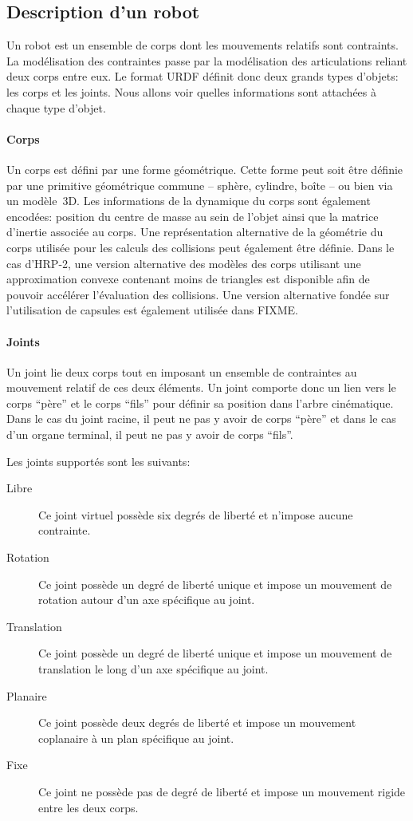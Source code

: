 \subsection{Description d'un robot}


Un robot est un ensemble de corps dont les mouvements relatifs sont
contraints. La modélisation des contraintes passe par la modélisation
des articulations reliant deux corps entre eux. Le format URDF définit
donc deux grands types d'objets: les corps et les joints. Nous allons
voir quelles informations sont attachées à chaque type d'objet.

\paragraph{Corps}

Un corps est défini par une forme géométrique. Cette forme peut soit
être définie par une primitive géométrique commune -- sphère,
cylindre, boîte -- ou bien via un modèle 3D. Les informations de la
dynamique du corps sont également encodées: position du centre de
masse au sein de l'objet ainsi que la matrice d'inertie associée au
corps. Une représentation alternative de la géométrie du corps
utilisée pour les calculs des collisions peut également être
définie. Dans le cas d'HRP-2, une version alternative des modèles des
corps utilisant une approximation convexe contenant moins de triangles
est disponible afin de pouvoir accélérer l'évaluation des
collisions. Une version alternative fondée sur l'utilisation de
capsules est également utilisée dans FIXME.


\paragraph{Joints}

Un joint lie deux corps tout en imposant un ensemble de contraintes au
mouvement relatif de ces deux éléments. Un joint comporte donc un lien
vers le corps ``père'' et le corps ``fils'' pour définir sa position
dans l'arbre cinématique. Dans le cas du joint racine, il peut ne pas
y avoir de corps ``père'' et dans le cas d'un organe terminal, il peut
ne pas y avoir de corps ``fils''.

Les joints supportés sont les suivants:
\begin{description}
\item[Libre] Ce joint virtuel possède six degrés de liberté et
  n'impose aucune contrainte.
\item[Rotation] Ce joint possède un degré de liberté unique et impose
  un mouvement de rotation autour d'un axe spécifique au joint.
\item[Translation] Ce joint possède un degré de liberté unique et
  impose un mouvement de translation le long d'un axe spécifique au
  joint.
\item[Planaire] Ce joint possède deux degrés de liberté et impose un
  mouvement coplanaire à un plan spécifique au joint.
\item[Fixe] Ce joint ne possède pas de degré de liberté et impose un
  mouvement rigide entre les deux corps.
\end{description}

